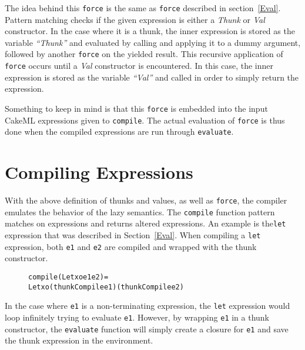\noindent The idea behind this \texttt{force} is the same as \texttt{force} described
in section~\ref{Eval}. Pattern matching checks if the given expression is either
a \textit{Thunk} or \textit{Val} constructor. In the case where it is a thunk,
the inner expression is stored as the variable \textit{``Thunk''} and evaluated
by calling and applying it to a dummy argument, followed by another
\texttt{force} on the yielded result. This recursive application of
\texttt{force} occurs until a \textit{Val} constructor is encountered. In this
case, the inner expression is stored as the variable \textit{``Val''} and called
in order to simply return the expression.

Something to keep in mind is that this \texttt{force} is embedded into the input
CakeML expressions given to \texttt{compile}. The actual evaluation of
\texttt{force} is thus done when the compiled expressions are run through
\texttt{evaluate}.

\section{Compiling Expressions}
With the above definition of thunks and values, as well as \texttt{force}, the
compiler emulates the behavior of the lazy semantics. The \texttt{compile}
function pattern matches on expressions and returns altered expressions.
An example is the\texttt{let} expression that was described in
Section~\ref{Eval}.
When compiling a \texttt{let} expression, both \texttt{e1} and \texttt{e2} are
compiled and wrapped with the thunk constructor.

\begin{figure}[!ht]
\begin{alltt}
compile (Let xo e1 e2) =
  Let xo (thunkCompile e1) (thunkCompile e2)
\end{alltt}
\end{figure}

\noindent In the case where \texttt{e1} is a non-terminating expression,
the \texttt{let} expression would loop infinitely trying to evaluate
\texttt{e1}. However, by wrapping \texttt{e1} in a thunk constructor, the
\texttt{evaluate} function will simply create a closure for \texttt{e1} and save
the thunk expression in the environment.


